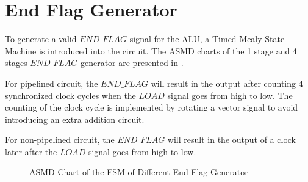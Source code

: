 \section{End Flag Generator}

To generate a valid \(END\_FLAG\) signal for the ALU, a Timed Mealy State Machine is introduced into the circuit.
The ASMD charts of the 1 stage and 4 stages \(END\_FLAG\) generator are presented in .

For pipelined circuit, the \(END\_FLAG\) will result in the output after counting 4 synchronized clock cycles
when the \(LOAD\) signal goes from high to low. The counting of the clock cycle is implemented by rotating a
vector signal to avoid introducing an extra addition circuit.

For non-pipelined circuit, the \(END\_FLAG\) will result in the output of a clock later after the \(LOAD\) signal goes from high to low.

\begin{figure}[!ht]
	\centering
	\caption{ASMD Chart of the FSM of Different End Flag Generator}
	\label{fig:asmd}

	\hspace{1cm}

\end{figure}

